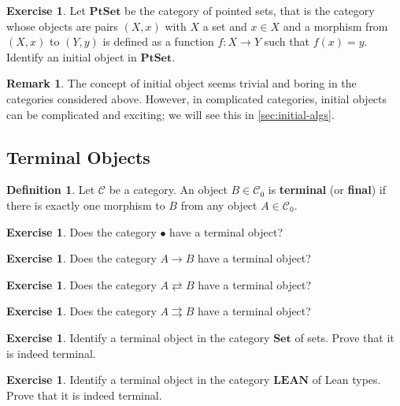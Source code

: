 \documentclass[a4paper,10pt]{scrartcl}
\theoremstyle{plain}
\theoremstyle{definition}
\newtheorem{rem}[thm]{Remark}
\newtheorem{dfn}[thm]{Definition}
\newtheorem{exer}[thm]{Exercise}
\newcommand{\Cat}[1]{\mathcal{#1}}
\newcommand{\CC}{\Cat{C}}
\newcommand{\Catb}[1]{\mathbf{#1}}
\newcommand{\SET}{\Catb{Set}}
\newcommand{\PTSET}{\Catb{PtSet}}
\newcommand{\LEAN}{\Catb{LEAN}}
\newcommand{\Ob}[1]{{#1}_0}
\begin{document}
\begin{exer} Let $\PTSET$ be the category of pointed sets, that is the category whose objects are pairs $(X,x)$ with $X$ a set and $x\in X$ and a morphism from $(X,x)$ to $(Y,y)$ is defined as a function $f:X\to Y$ such that $f(x)=y$. Identify an initial object in $\PTSET$.
\end{exer}

\begin{rem}
  The concept of initial object seems trivial and boring in the categories considered above.
  However, in complicated categories, initial objects can be complicated and exciting;
  we will see this in \cref{sec:initial-algs}.
\end{rem}

\subsection{Terminal Objects}
\label{sec:terminal-objects}



\begin{dfn}
  Let $\CC$ be a category. An object $B \in \Ob{\CC}$ is \textbf{terminal} (or \textbf{final}) if there is exactly one morphism to $B$ from any object $A \in \Ob{\CC}$.
\end{dfn}

\begin{exer}
  Does the category $\bullet$ have a terminal object?
\end{exer}

\begin{exer}
  Does the category $A \to B$ have a terminal object?
\end{exer}

\begin{exer}
  Does the category $A \rightleftarrows B$ have a terminal object?
\end{exer}

\begin{exer}
  Does the category $A \rightrightarrows B$ have a terminal object?
\end{exer}



\begin{exer}
  Identify a terminal object in the category $\SET$ of sets.
  Prove that it is indeed terminal.
\end{exer}

\begin{exer}
  Identify a terminal object in the category $\LEAN$ of Lean types.
  Prove that it is indeed terminal.
\end{exer}
\end{document}
